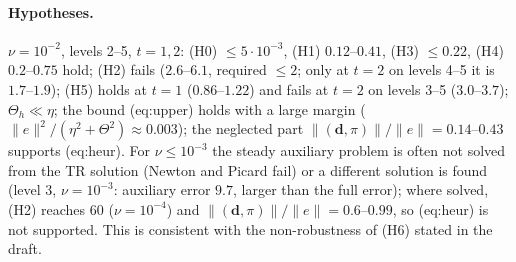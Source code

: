 \documentclass[11pt,a4paper]{article}
\newcommand{\bd}{\boldsymbol{d}}
\begin{document}
\paragraph{Hypotheses.} $\nu=10^{-2}$, levels 2--5, $t=1,2$: (H0) $\le5\cdot10^{-3}$, (H1) $0.12$--$0.41$, (H3) $\le0.22$, (H4)
$0.2$--$0.75$ hold; (H2) fails ($2.6$--$6.1$, required $\le2$; only at $t=2$ on levels 4--5 it is $1.7$--$1.9$); (H5) holds at $t=1$ ($0.86$--$1.22$) and fails at $t=2$
on levels 3--5 ($3.0$--$3.7$); $\Theta_h\ll\eta$; the bound (eq:upper) holds with a large margin ($\|e\|^2/(\eta^2+\Theta^2)\approx0.003$); the
neglected part $\|(\bd,\pi)\|/\|e\|=0.14$--$0.43$ supports (eq:heur). For $\nu\le10^{-3}$ the steady auxiliary problem is often
not solved from the TR solution (Newton and Picard fail) or a different solution is found (level 3, $\nu=10^{-3}$: auxiliary
error $9.7$, larger than the full error); where solved, (H2) reaches $60$ ($\nu=10^{-4}$) and $\|(\bd,\pi)\|/\|e\|=0.6$--$0.99$,
so (eq:heur) is not supported. This is consistent with the non-robustness of (H6) stated in the draft.
\end{document}
